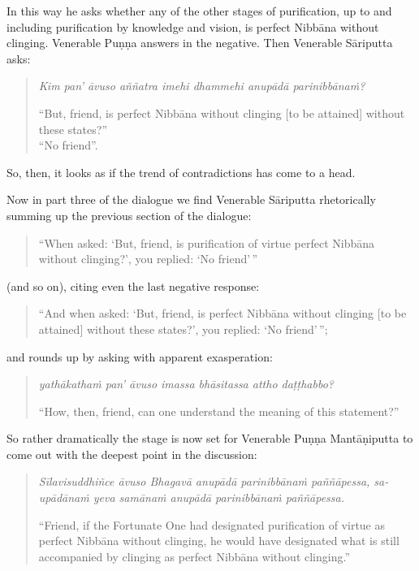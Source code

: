In this way he asks whether any of the other stages of purification, up to and including purification by knowledge and vision, is perfect Nibbāna without clinging. Venerable Puṇṇa answers in the negative. Then Venerable Sāriputta asks:

\begin{quote}
\emph{Kim pan' āvuso aññatra imehi dhammehi anupādā parinibbānaṁ?}

``But, friend, is perfect Nibbāna without clinging {[}to be attained{]} without these states?''\\
``No friend''.
\end{quote}

So, then, it looks as if the trend of contradictions has come to a head.

Now in part three of the dialogue we find Venerable Sāriputta rhetorically summing up the previous section of the dialogue:

\begin{quote}
``When asked: `But, friend, is purification of virtue perfect Nibbāna without clinging?', you replied: `No friend'\,''
\end{quote}

(and so on), citing even the last negative response:

\begin{quote}
``And when asked: `But, friend, is perfect Nibbāna without clinging {[}to be attained{]} without these states?', you replied: `No friend'\,'';
\end{quote}

and rounds up by asking with apparent exasperation:

\begin{quote}
\emph{yathākathaṁ pan' āvuso imassa bhāsitassa attho daṭṭhabbo?}

``How, then, friend, can one understand the meaning of this statement?''
\end{quote}

So rather dramatically the stage is now set for Venerable Puṇṇa Mantāṇiputta to come out with the deepest point in the discussion:

\begin{quote}
\emph{Sīlavisuddhiñce āvuso Bhagavā anupādā parinibbānaṁ paññāpessa, sa-upādānaṁ yeva samānaṁ anupādā parinibbānaṁ paññāpessa.}

``Friend, if the Fortunate One had designated purification of virtue as perfect Nibbāna without clinging, he would have designated what is still accompanied by clinging as perfect Nibbāna without clinging.''
\end{quote}

